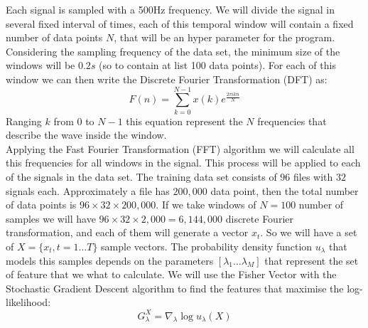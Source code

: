 \documentclass[final,leqno,onefignum,onetabnum]{siamltexmm}
\begin{document}
Each signal is sampled with a 500Hz frequency. We will divide the signal in several fixed interval of times, each of this temporal window will contain a fixed number of data points $N$, that will be an hyper parameter for the program. Considering the sampling frequency of the data set, the minimum size of the windows will be $0.2 s$ (so to contain at list 100 data points). 
For each of this window we can then write the Discrete Fourier Transformation (DFT) as:
\begin{equation}
  \label{DFT}
  F(n) =\sum_{k=0}^{N-1}x(k)e^{\frac{2\pi i kn}{N}}
\end{equation}  
Ranging $k$ from $0$ to $N-1$ this equation represent the $N$ frequencies that describe the wave inside the window.\\
Applying the Fast Fourier Transformation (FFT) algorithm\cite{FFT} we will calculate all this frequencies for all windows in the signal. This process will be applied to each of the signals in the data set. The training data set consists of $96$ files with $32$ signals each. Approximately a file has $200,000$ data point, then the total number of data points is $96\times 32 \times 200,000$. If we take windows of $N=100$ number of samples we will have $96\times 32 \times 2,000=6,144,000$ discrete Fourier transformation, and each of them will generate a vector $x_t$. So we will have a set of $X=\{x_t,t=1\dots T\}$ sample vectors. The probability density function  $u_\lambda$  that models this samples
depends on the parameters $[\lambda_1\dots \lambda_M]$ that represent the set of feature that we what to calculate. We will use the Fisher Vector\cite{fisher} with the Stochastic Gradient Descent algorithm to find the features that maximise the log-likelihood:
\begin{equation}\label{loglikelihood}
G_\lambda^X= \nabla_\lambda \log u_\lambda(X)
\end{equation}


\end{document}
